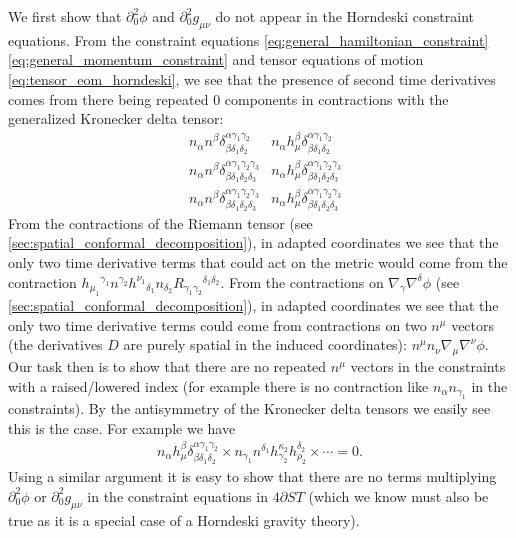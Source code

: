 \documentclass{ws-ijmpd}
\begin{document}
We first show that 
$\partial_0^2\phi$ and $\partial_0^2g_{\mu\nu}$
do not appear in the Horndeski constraint equations.
From the constraint equations 
\eqref{eq:general_hamiltonian_constraint} 
\eqref{eq:general_momentum_constraint}
and tensor equations of motion \eqref{eq:tensor_eom_horndeski},
we see that the presence of second
time derivatives comes from there being repeated $0$ components
in contractions with the generalized Kronecker delta tensor:
\begin{align}
   &
   n_{\alpha}n^{\beta}
   \delta^{\alpha\gamma_1\gamma_2}_{\beta\delta_1\delta_2}
   &
   n_{\alpha}h_{\mu}^{\beta}
   \delta^{\alpha\gamma_1\gamma_2}_{\beta\delta_1\delta_2}
   \nonumber\\
   &
   n_{\alpha}n^{\beta}
   \delta^{\alpha\gamma_1\gamma_2\gamma_3}_{\beta\delta_1\delta_2\delta_3}
   &
   n_{\alpha}h_{\mu}^{\beta}
   \delta^{\alpha\gamma_1\gamma_2\gamma_3}_{\beta\delta_1\delta_2\delta_3}
   \nonumber\\
   &
   n_{\alpha}n^{\beta}
   \delta^{\alpha\gamma_1\gamma_2\gamma_3}_{\beta\delta_1\delta_2\delta_3}
   &
   n_{\alpha}h_{\mu}^{\beta}
   \delta^{\alpha\gamma_1\gamma_2\gamma_3}_{\beta\delta_1\delta_2\delta_3}
   \nonumber
\end{align}
From the contractions of the Riemann tensor 
(see \ref{sec:spatial_conformal_decomposition}),
in adapted coordinates
we see that the only two time derivative terms that could act on the
metric would come from the contraction 
$
h_{\mu_1}{}^{\gamma_1}
n^{\gamma_2}
h^{\nu_1}{}_{\delta_1}
n_{\delta_2}
R_{\gamma_1\gamma_2}{}^{\delta_1\delta_2}
$.
From the contractions on $\nabla_{\gamma}\nabla^{\delta}\phi$
(see \ref{sec:spatial_conformal_decomposition}),
in adapted coordinates we see that the only two
time derivative terms could come from contractions on two $n^{\mu}$ vectors
(the derivatives $D$ are purely spatial in the induced coordinates):
$n^{\mu}n_{\nu}\nabla_{\mu}\nabla^{\nu}\phi$.
Our task then is to show that there are no repeated $n^{\mu}$ vectors 
in the constraints with a raised/lowered index (for example there is no
contraction like $n_{\alpha}n_{\gamma_1}$ in the constraints).
By the antisymmetry of the Kronecker delta tensors we easily see this is
the case. For example we have 
\begin{align}
   n_{\alpha}h_{\mu}^{\beta}
   \delta^{\alpha\gamma_1\gamma_2}_{\beta\delta_1\delta_2}
   \times
   n_{\gamma_1}n^{\delta_1}
   h_{\gamma_2}^{\kappa_2}
   h_{\rho_2}^{\delta_2}
   \times
   \cdots
   =
   0
   .
\end{align}
Using a similar argument it is easy to show that
there are no terms multiplying $\partial_0^2\phi$ or 
$\partial_0^2g_{\mu\nu}$ in the constraint equations in
$4\partial ST$ (which we know must also
be true as it is a special case of a Horndeski gravity 
theory)\cite{East:2020hgw}.
\end{document}

